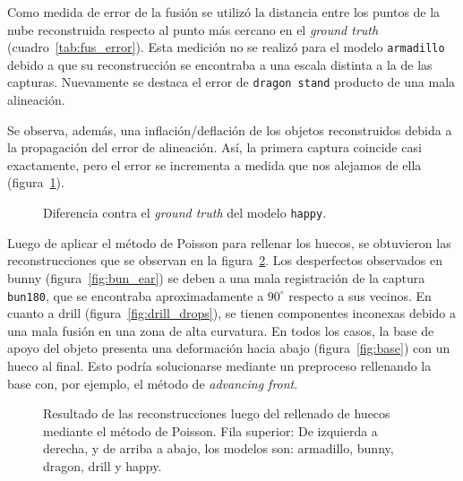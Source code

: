 		Como medida de error de la fusión se utilizó la distancia entre los puntos de la nube reconstruida
		respecto al punto más cercano en el \emph{ground truth} (cuadro~\ref{tab:fus_error}).
		Esta medición no se realizó para el modelo \texttt{armadillo} debido a que su reconstrucción
		se encontraba a una escala distinta a la de las capturas.
		Nuevamente se destaca el error de \texttt{dragon stand} producto de una mala alineación.

		


		Se observa, además, una inflación/deflación de los objetos
		reconstruidos debida a la propagación del error de alineación.  Así, la
		primera captura coincide casi exactamente, pero el error se incrementa
		a medida que nos alejamos de ella (figura~\ref{fig:fus_happy}).

		\begin{figure}
			\caption{\label{fig:fus_happy}Diferencia contra el \emph{ground truth} del modelo \texttt{happy}.}
		\end{figure}


		Luego de aplicar el método de Poisson para rellenar los huecos, se
		obtuvieron las reconstrucciones que se observan en la
		figura~\ref{fig:poiss_all}.
		Los desperfectos observados en bunny (figura~\ref{fig:bun_ear}) se deben a una mala registración
		de la captura \texttt{bun180}, que se encontraba aproximadamente a
		$90^{\circ}$ respecto a sus vecinos.
		En cuanto a drill (figura~\ref{fig:drill_drops}), se tienen componentes
		inconexas debido a una mala fusión en una zona de alta curvatura.
		En todos los casos, la base de apoyo del objeto presenta una
		deformación hacia abajo (figura~\ref{fig:base}) con un hueco al final.
		Esto podría solucionarse mediante un preproceso rellenando la base con,
		por ejemplo, el método de \emph{advancing front}.

		\begin{figure}
			\caption{\label{fig:poiss_all}Resultado de las reconstrucciones luego del rellenado de huecos mediante el método de Poisson.
			Fila superior:
			De izquierda a derecha, y de arriba a abajo, los modelos son: armadillo, bunny, dragon, drill y happy.}
		\end{figure}

